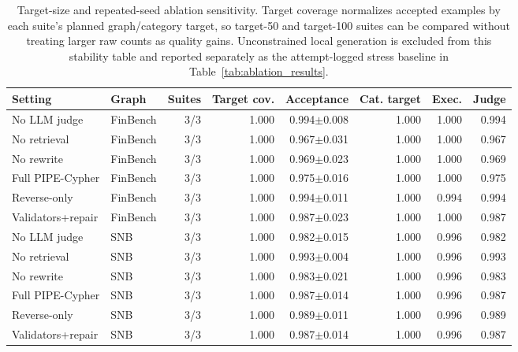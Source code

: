 \begin{table}[H]
\centering
\small
\begin{tabular}{llrrrrrr}
\toprule
Setting & Graph & Suites & Target cov. & Acceptance & Cat. target & Exec. & Judge \\
\midrule
No LLM judge & FinBench & 3/3 & 1.000 & 0.994$\pm$0.008 & 1.000 & 1.000 & 0.994 \\
No retrieval & FinBench & 3/3 & 1.000 & 0.967$\pm$0.031 & 1.000 & 1.000 & 0.967 \\
No rewrite & FinBench & 3/3 & 1.000 & 0.969$\pm$0.023 & 1.000 & 1.000 & 0.969 \\
Full PIPE-Cypher & FinBench & 3/3 & 1.000 & 0.975$\pm$0.016 & 1.000 & 1.000 & 0.975 \\
Reverse-only & FinBench & 3/3 & 1.000 & 0.994$\pm$0.011 & 1.000 & 0.994 & 0.994 \\
Validators+repair & FinBench & 3/3 & 1.000 & 0.987$\pm$0.023 & 1.000 & 1.000 & 0.987 \\
No LLM judge & SNB & 3/3 & 1.000 & 0.982$\pm$0.015 & 1.000 & 0.996 & 0.982 \\
No retrieval & SNB & 3/3 & 1.000 & 0.993$\pm$0.004 & 1.000 & 0.996 & 0.993 \\
No rewrite & SNB & 3/3 & 1.000 & 0.983$\pm$0.021 & 1.000 & 0.996 & 0.983 \\
Full PIPE-Cypher & SNB & 3/3 & 1.000 & 0.987$\pm$0.014 & 1.000 & 0.996 & 0.987 \\
Reverse-only & SNB & 3/3 & 1.000 & 0.989$\pm$0.011 & 1.000 & 0.996 & 0.989 \\
Validators+repair & SNB & 3/3 & 1.000 & 0.987$\pm$0.014 & 1.000 & 0.996 & 0.987 \\
\bottomrule
\end{tabular}
\caption{Target-size and repeated-seed ablation sensitivity. Target coverage normalizes accepted examples by each suite's planned graph/category target, so target-50 and target-100 suites can be compared without treating larger raw counts as quality gains. Unconstrained local generation is excluded from this stability table and reported separately as the attempt-logged stress baseline in Table~\ref{tab:ablation_results}.}
\label{tab:ablation_suite_comparison}
\end{table}
